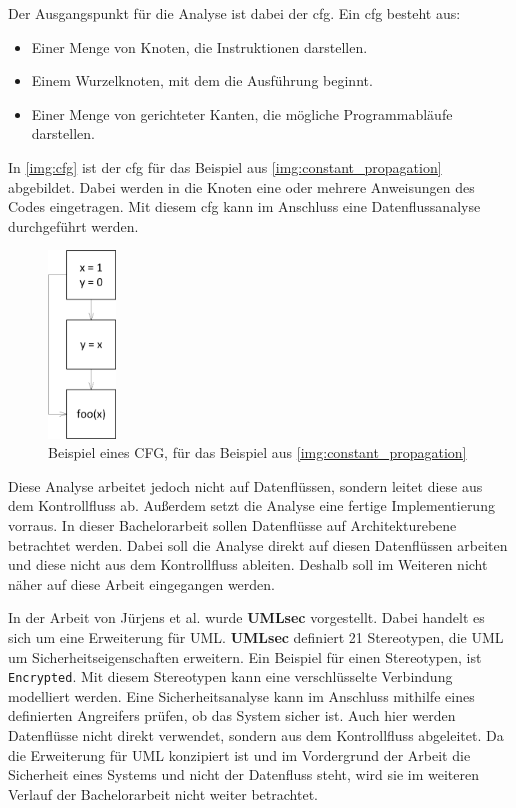 Der Ausgangspunkt für die Analyse ist dabei der \gls{cfg}. Ein \gls{cfg} besteht aus:
\begin{itemize}
\item Einer Menge von Knoten, die Instruktionen darstellen.
\item Einem Wurzelknoten, mit dem die Ausführung beginnt.
\item Einer Menge von gerichteter Kanten, die mögliche Programmabläufe darstellen.
\end{itemize}
In \autoref{img:cfg} ist der \gls{cfg} für das Beispiel aus \autoref{img:constant_propagation} abgebildet. Dabei werden in die Knoten eine oder mehrere Anweisungen des Codes eingetragen. Mit diesem \gls{cfg} kann im Anschluss eine Datenflussanalyse durchgeführt werden. \par
\begin{figure}[h]
	\centering
  	\includegraphics[width=0.16\textwidth]{images/cfg.png}
	\caption{Beispiel eines CFG, für das Beispiel aus \autoref{img:constant_propagation}}
	\label{img:cfg}
\end{figure}
Diese Analyse arbeitet jedoch nicht auf Datenflüssen, sondern leitet diese aus dem Kontrollfluss ab. Außerdem setzt die Analyse eine fertige Implementierung vorraus. In dieser Bachelorarbeit sollen Datenflüsse auf Architekturebene betrachtet werden. Dabei soll die Analyse direkt auf diesen Datenflüssen arbeiten und diese nicht aus dem Kontrollfluss ableiten. Deshalb soll im Weiteren nicht näher auf diese Arbeit eingegangen werden. \par 
In der Arbeit von Jürjens et al. \cite{Jurjens2005} wurde \textbf{UMLsec} vorgestellt. Dabei handelt es sich um eine Erweiterung für UML. \textbf{UMLsec} definiert 21 Stereotypen, die UML um Sicherheitseigenschaften erweitern. Ein Beispiel für einen Stereotypen, ist \texttt{Encrypted}. Mit diesem Stereotypen kann eine verschlüsselte Verbindung modelliert werden. Eine Sicherheitsanalyse kann im Anschluss mithilfe eines definierten Angreifers prüfen, ob das System sicher ist. Auch hier werden Datenflüsse nicht direkt verwendet, sondern aus dem Kontrollfluss abgeleitet. Da die Erweiterung für UML konzipiert ist und im Vordergrund der Arbeit die Sicherheit eines Systems und nicht der Datenfluss steht, wird sie im weiteren Verlauf der Bachelorarbeit nicht weiter betrachtet. \par
